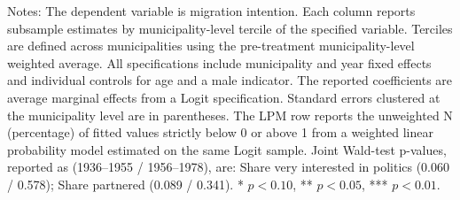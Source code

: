 \begin{table}[!h]
\caption*{\footnotesize Notes: The dependent variable is migration intention. Each column reports subsample estimates by municipality-level tercile of the specified variable. Terciles are defined across municipalities using the pre-treatment municipality-level weighted average. All specifications include municipality and year fixed effects and individual controls for age and a male indicator. The reported coefficients are average marginal effects from a Logit specification. Standard errors clustered at the municipality level are in parentheses. The LPM row reports the unweighted N (percentage) of fitted values strictly below 0 or above 1 from a weighted linear probability model estimated on the same Logit sample. Joint Wald-test p-values, reported as (1936--1955 / 1956--1978), are: Share very interested in politics (0.060 / 0.578); Share partnered (0.089 / 0.341). * \(p<0.10\), ** \(p<0.05\), *** \(p<0.01\).}
\end{table}
